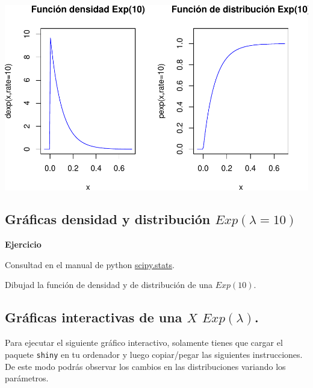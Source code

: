\documentclass[]{book}
\begin{document}
\begin{center}\includegraphics{curso-probabilidad-udemy_files/figure-latex/unnamed-chunk-93-1} \end{center}

\hypertarget{gruxe1ficas-densidad-y-distribuciuxf3n-explambda10-2}{%
\subsection{\texorpdfstring{Gráficas densidad y distribución \(Exp(\lambda=10)\)}{Gráficas densidad y distribución Exp(\textbackslash{}lambda=10)}}\label{gruxe1ficas-densidad-y-distribuciuxf3n-explambda10-2}}

\textbf{Ejercicio}

Consultad en el manual de python \href{https://docs.scipy.org/doc/scipy/reference/generated/scipy.stats.expon.html}{scipy.stats}.

Dibujad la función de densidad y de distribución de una \(Exp(10).\)

\hypertarget{gruxe1ficas-interactivas-de-una-x-explambda.}{%
\subsection{\texorpdfstring{Gráficas interactivas de una \(X\) \(Exp(\lambda)\).}{Gráficas interactivas de una X Exp(\textbackslash{}lambda).}}\label{gruxe1ficas-interactivas-de-una-x-explambda.}}

Para ejecutar el siguiente gráfico interactivo, solamente tienes que cargar el paquete \texttt{shiny} en tu ordenador y luego copiar/pegar las siguientes instrucciones. De este modo podrás observar los cambios en las distribuciones variando los parámetros.
\end{document}

